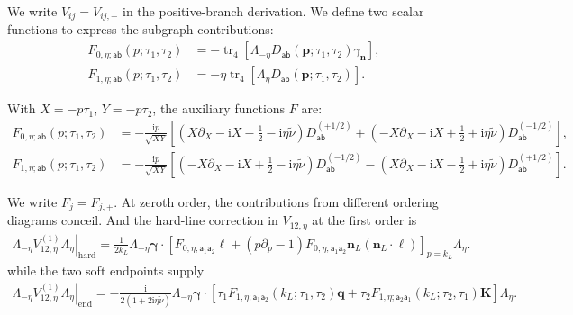 \documentclass[a4paper,12pt]{article}
\newcommand{\ii}{\mathrm i}
\newcommand{\mb}{\mathbf}
\newcommand{\tn}{\tilde\nu}
\def\aa{\mathsf a}
\newcommand{\bb}{\mathsf b}
\newcommand{\tr}{\operatorname{tr}}
\begin{document}
We write $V_{ij}=V_{ij,+}$ in the positive-branch derivation.
We define two scalar functions to express the subgraph contributions:
\begin{align}
 F_{0,\eta;\aa\bb}(p;\tau_1,\tau_2)
 &=-\tr_4[\Lambda_{-\eta}D_{\aa\bb}(\mb p;\tau_1,\tau_2)
                      \gamma_{\mb n}],\nonumber\\
 F_{1,\eta;\aa\bb}(p;\tau_1,\tau_2)
 &=-\eta\tr_4[\Lambda_\eta D_{\aa\bb}(\mb p;\tau_1,\tau_2)].
 \label{eq:dirac-hard-kernel-traces}
\end{align}

With $X=-p\tau_1$, $Y=-p\tau_2$, the auxiliary functions $F$ are:
\begin{align}
 F_{0,\eta;\aa\bb}(p;\tau_1,\tau_2)
 &=-\frac{\ii p}{\sqrt{XY}}\left[
 (X\partial_X-\ii X-\tfrac12-\ii\eta\tn)D^{(+1/2)}_{\aa\bb}
 +(-X\partial_X-\ii X+\tfrac12+\ii\eta\tn)D^{(-1/2)}_{\aa\bb}
 \right],\nonumber\\
 F_{1,\eta;\aa\bb}(p;\tau_1,\tau_2)
 &=-\frac{\ii p}{\sqrt{XY}}\left[
 (-X\partial_X-\ii X+\tfrac12-\ii\eta\tn)D^{(-1/2)}_{\aa\bb}
 -(X\partial_X-\ii X-\tfrac12+\ii\eta\tn)D^{(+1/2)}_{\aa\bb}
 \right].
 \label{eq:dirac-hard-kernels}
\end{align}

We write $F_j=F_{j,+}$. 
At zeroth order, the contributions from different ordering diagrams conceil.
And the hard-line correction in $V_{12,\eta}$ at the first order is
\begin{align}
 \left.\Lambda_{-\eta}V_{12,\eta}^{(1)}\Lambda_\eta\right|_{\mathrm{hard}}
 =\frac1{2k_L}\Lambda_{-\eta}\bm\gamma\cdot
 \left[F_{0,\eta;\aa_1\aa_2}\bm\ell
 +(p\partial_p-1)F_{0,\eta;\aa_1\aa_2}
       \mb n_L(\mb n_L\cdot\bm\ell)\right]_{p=k_L}\Lambda_\eta.
 \label{eq:dirac-hard-expansion}
\end{align}
while the two soft endpoints supply
\begin{align}
 \left.\Lambda_{-\eta}V_{12,\eta}^{(1)}\Lambda_\eta\right|_{\mathrm{end}}
 =-\frac{\ii}{2(1+2\ii\eta\tn)}\Lambda_{-\eta}\bm\gamma\cdot
 \left[\tau_1F_{1,\eta;\aa_1\aa_2}(k_L;\tau_1,\tau_2)\mb q
 +\tau_2F_{1,\eta;\aa_2\aa_1}(k_L;\tau_2,\tau_1)\mb K\right]\Lambda_\eta.
 \label{eq:dirac-endpoint-correction}
\end{align}
\end{document}
